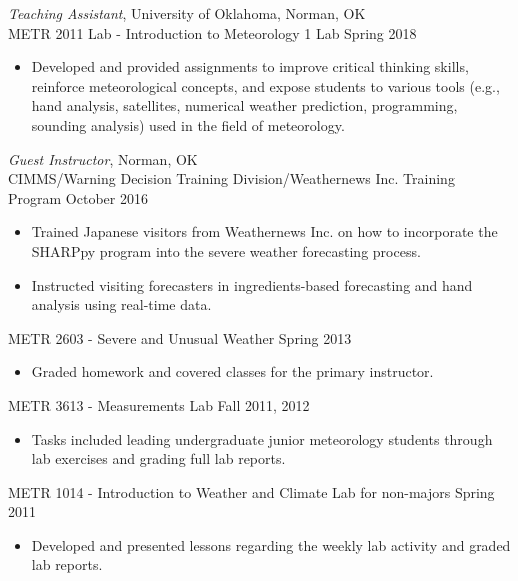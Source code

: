 \documentclass[10pt]{res} %
\begin{document}
\begin{resume}
{\sl Teaching Assistant}, University of Oklahoma, Norman, OK \\
METR 2011 Lab - Introduction to Meteorology 1 Lab \hfill Spring 2018
\begin{itemize} \itemsep 2pt %
\item Developed and provided assignments to improve critical thinking skills, reinforce meteorological concepts, and expose students to various tools (e.g., hand analysis, satellites, numerical weather prediction, programming, sounding analysis) used in the field of meteorology.  
\end{itemize}

{\sl Guest Instructor}, Norman, OK \\[2pt]
CIMMS/Warning Decision Training Division/Weathernews Inc. Training Program  \hfill October 2016
\begin{itemize} \itemsep 2pt %
\item Trained Japanese visitors from Weathernews Inc. on how to incorporate the SHARPpy program into the severe weather forecasting process.
\item Instructed visiting forecasters in ingredients-based forecasting and hand analysis using real-time data.
\end{itemize}

METR 2603 - Severe and Unusual Weather \hfill Spring 2013
\begin{itemize} \itemsep 2pt %
\item Graded homework and covered classes for the primary instructor.
\end{itemize}

METR 3613 - Measurements Lab \hfill Fall 2011, 2012 
\begin{itemize} \itemsep 2pt %
\item Tasks included leading undergraduate junior meteorology students through lab exercises and grading full lab reports.  
\end{itemize}

METR 1014 - Introduction to Weather and Climate Lab for non-majors \hfill Spring 2011
\begin{itemize} \itemsep 2pt %
\item Developed and presented lessons regarding the weekly lab activity and graded lab reports.
\end{itemize}


\end{resume}
\end{document}
